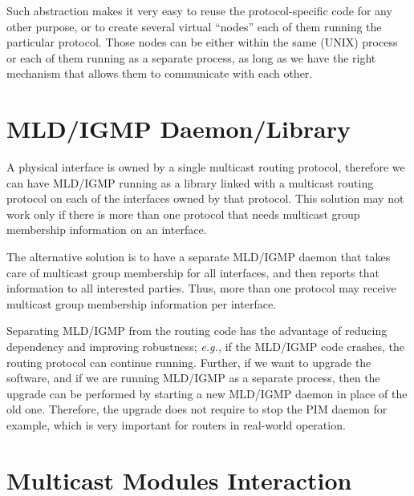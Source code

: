\documentclass[11pt]{article}
\newcommand{\eg}{\emph{e.g.,}\xspace}
\begin{document}
Such abstraction makes it very easy to reuse the protocol-specific code
for any other purpose, or to create several virtual ``nodes'' each of
them running the particular protocol. Those nodes can be either within
the same (UNIX) process or each of them running as a separate process,
as long as we have the right mechanism that allows them to communicate
with each other.

\section{MLD/IGMP Daemon/Library}

A physical interface is owned by a single multicast routing
protocol, therefore we can have MLD/IGMP running as a library linked with
a multicast routing protocol on each of the
interfaces owned by that protocol. This solution may not work only if
there is more than one protocol that needs multicast group membership
information on an interface.

The alternative solution is to have a separate MLD/IGMP daemon that
takes care of multicast group membership for all interfaces, and then
reports that information to all interested parties. Thus, more than one
protocol may receive multicast group membership information per
interface.

Separating MLD/IGMP from the routing code has the advantage of reducing
dependency and improving robustness; \eg if the MLD/IGMP code crashes, the
routing protocol can continue running. Further, if we want to upgrade
the software, and if we are running MLD/IGMP as a
separate process, then the upgrade can be performed by starting a new
MLD/IGMP daemon in place of the old one. Therefore, the upgrade does
not require to stop the PIM daemon for example, which is very important
for routers in real-world operation.

\section{Multicast Modules Interaction}
\end{document}
